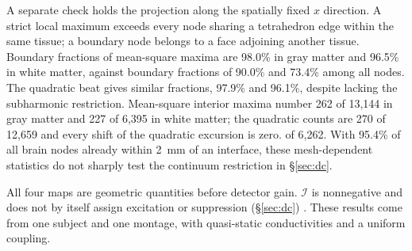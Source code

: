 \documentclass[11pt,a4paper]{article}
\providecommand{\DIFaddtex}[1]{{\protect\color{blue} \sf #1}} %
\providecommand{\DIFdeltex}[1]{{\protect\color{red} \scriptsize #1}} %
\providecommand{\DIFaddbegin}{} %
\providecommand{\DIFaddend}{} %
\providecommand{\DIFdelbegin}{} %
\providecommand{\DIFdelend}{} %
\providecommand{\DIFadd}[1]{\texorpdfstring{\DIFaddtex{#1}}{#1}} %
\providecommand{\DIFdel}[1]{\texorpdfstring{\DIFdeltex{#1}}{}} %
\begin{document}
\DIFadd{A separate check holds the projection along the spatially fixed $x$ direction.
A strict local maximum exceeds every node sharing a tetrahedron edge within
the same tissue; a boundary node belongs to a face adjoining another tissue.
Boundary fractions of mean-square maxima are 98.0\% in gray matter and
96.5\% in white matter, against boundary fractions of 90.0\% and 73.4\%
among all nodes. The quadratic beat gives similar fractions, 97.9\% and
96.1\%, despite lacking the subharmonic restriction. Mean-square interior
maxima number 262 of 13,144 in gray matter and 227 of 6,395 in white matter;
the quadratic counts are 270 of 12,659 }\DIFaddend and \DIFdelbegin \DIFdel{every shift of the quadratic excursion is zero.
}\DIFdelend \DIFaddbegin \DIFadd{245 of 6,262. With 95.4\% of all
brain nodes already within 2~mm of an interface, these mesh-dependent
statistics do not sharply test the continuum restriction in \S\ref{sec:dc}.
}\DIFaddend

\DIFdelbegin \DIFdel{All four maps are geometric quantities before detector gain.
$\mathcal I$ is nonnegative and does not by itself assign excitation or suppression
(\S\ref{sec:dc}) . These results come from one subject and one montage, with
quasi-static conductivities and a uniform coupling. }\DIFdelend \DIFaddbegin \fi
\DIFaddend
\end{document}
